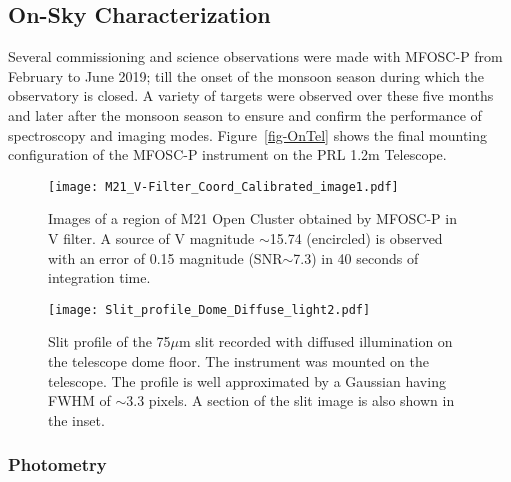 
\par
\subsection{On-Sky Characterization} 
\label{subsec-OnSkyCharact}
\par

Several commissioning and science observations were made with MFOSC-P from February to June 2019; till the onset of the monsoon season during which the observatory is closed. A variety of targets were observed over these five months and later after the monsoon season to ensure and confirm the performance of spectroscopy and imaging modes. Figure~\ref{fig-OnTel} shows the final mounting configuration of the MFOSC-P instrument on the PRL 1.2m Telescope.


\begin{figure*}
	\centering
	\texttt{[image: M21\_V-Filter\_Coord\_Calibrated\_image1.pdf]}
	\vspace{0.2cm}
	\caption{Images of a region of M21 Open Cluster obtained by MFOSC-P in V filter. A source of V magnitude $\sim$15.74 (encircled) is observed with an error of 0.15 magnitude (SNR$\sim$7.3) in 40 seconds of integration time.}
	\label{fig-Imaging-V-Band}
\end{figure*}

\begin{figure}
	\centering
	\texttt{[image: Slit\_profile\_Dome\_Diffuse\_light2.pdf]}
	\vspace{0.2cm}
	\caption{Slit profile of the 75$\mu$m slit recorded with diffused illumination on the telescope dome floor. The instrument was mounted on the telescope. The profile is well approximated by a Gaussian having FWHM of $\sim$3.3 pixels. A section of the slit image is also shown in the inset.}
	\label{fig-SlitProfile-DiffuseIllum}
\end{figure}


\par
\subsubsection{Photometry} 
\label{subsubsec-SkyPhot}
\par

